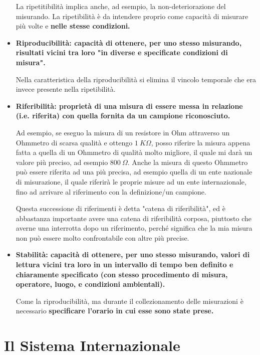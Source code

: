 \documentclass[a4paper,11pt]{report}
\begin{document}
\begin{itemize}
  La ripetitibilità implica anche, ad esempio, la non-deteriorazione del misurando. La ripetibilità è da intendere proprio come capacità di misurare più volte e \bf nelle stesse condizioni\rm.
  
  \item \bf Riproducibilità\rm: capacità di ottenere, per uno stesso misurando, risultati vicini tra loro "in diverse e specificate condizioni di misura".
  
  Nella caratteristica della riproducibilità si elimina il vincolo temporale che era invece presente nella ripetibilità.
  
  \item \bf Riferibilità\rm: proprietà di una misura di essere messa in relazione (i.e. riferita) con quella fornita da un campione riconosciuto.
  
  Ad esempio, se eseguo la misura di un resistore in Ohm attraverso un Ohmmetro di scarsa qualità e ottengo $1\ K\Omega$, posso riferire la misura appena fatta a quella di un Ohmmetro di qualità molto migliore, il quale mi darà un valore più preciso, ad esempio $800\ \Omega$. Anche la misura di questo Ohmmetro può essere riferita ad una più precisa, ad esempio quella di un ente nazionale di misurazione, il quale riferirà le proprie misure ad un ente internazionale, fino ad arrivare al riferimento con la definizione/un campione.
  
  Questa successione di riferimenti è detta "catena di riferibilità", ed è abbastanza importante avere una catena di riferibilità corposa, piuttosto che averne una interrotta dopo un riferimento, perché significa che la mia misura non può essere molto confrontabile con altre più precise.
  
    \item \bf Stabilità\rm: capacità di ottenere, per uno stesso misurando, valori di lettura vicini tra loro in un intervallo di tempo ben definito e chiaramente specificato (con stesso procedimento di misura, operatore, luogo, e condizioni ambientali).
    
    Come la riproducibilità, ma durante il collezionamento delle misurazioni è necessario \bf specificare \rm l'orario in cui esse sono state prese.
  
\end{itemize}
\newpage
\section{Il Sistema Internazionale}
\end{document}
